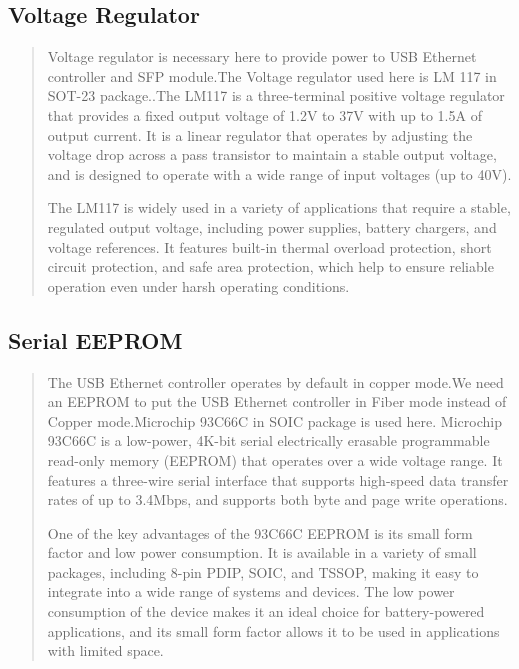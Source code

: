 \documentclass[fontsize=12pt,
parskip=half,	%
department=FakM,  %
twoside, %
DIV=15,BCOR=10mm, %
svgnames,table,hyperref, %
bookmarks, raiselinks, pageanchor, hyperindex, colorlinks, hidelinks, %
]{OTHRreprt}
\begin{document}
	\subsection{Voltage Regulator}
	\begin{quote}
	Voltage regulator is necessary here to provide power to USB Ethernet  controller and SFP module.The Voltage regulator used here is LM 117 in SOT-23 package..The LM117 is a three-terminal positive voltage regulator that provides a fixed output voltage of 1.2V to 37V with up to 1.5A of output current. It is a linear regulator that operates by adjusting the voltage drop across a pass transistor to maintain a stable output voltage, and is designed to operate with a wide range of input voltages (up to 40V).

	The LM117 is widely used in a variety of applications that require a stable, regulated output voltage, including power supplies, battery chargers, and voltage references. It features built-in thermal overload protection, short circuit protection, and safe area protection, which help to ensure reliable operation even under harsh operating conditions.
	\end{quote}	
	
	\subsection{Serial EEPROM}
	\begin{quote}
	The USB Ethernet controller operates  by default in copper mode.We need an EEPROM to put the USB Ethernet controller in Fiber mode instead of Copper mode.Microchip 93C66C in SOIC package  is used here. Microchip 93C66C is a low-power, 4K-bit serial electrically erasable programmable read-only memory (EEPROM) that operates over a wide voltage range. It features a three-wire serial interface that supports high-speed data transfer rates of up to 3.4Mbps, and supports both byte and page write operations.

One of the key advantages of the 93C66C EEPROM is its small form factor and low power consumption. It is available in a variety of small packages, including 8-pin PDIP, SOIC, and TSSOP, making it easy to integrate into a wide range of systems and devices. The low power consumption of the device makes it an ideal choice for battery-powered applications, and its small form factor allows it to be used in applications with limited space.
	\end{quote}
	
\end{document}
